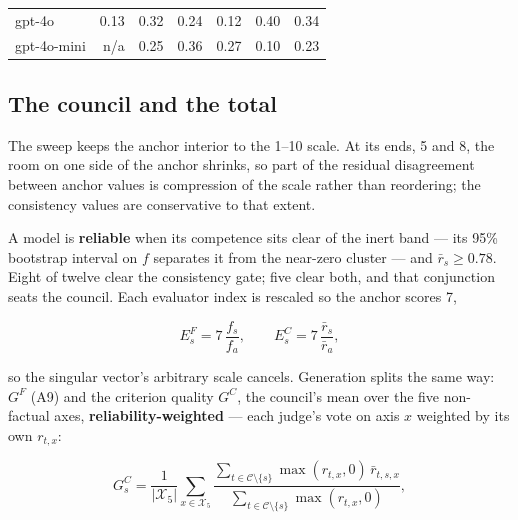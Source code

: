 \documentclass{article}
\begin{document}
\begin{table}[H]
\begin{center}
{\begin{tabular}{@{}lrrrrrr@{}}
gpt-4o &\cellcolor[HTML]{EBF7B1}\textcolor[HTML]{1A1A1A}{0.13}&\cellcolor[HTML]{9FD9B8}\textcolor[HTML]{1A1A1A}{0.32}&\cellcolor[HTML]{CAEAB4}\textcolor[HTML]{1A1A1A}{0.24}&\cellcolor[HTML]{EEF8B3}\textcolor[HTML]{1A1A1A}{0.12}&\cellcolor[HTML]{73C8BD}\textcolor[HTML]{1A1A1A}{0.40}&\cellcolor[HTML]{93D5B9}\textcolor[HTML]{1A1A1A}{0.34} \\
gpt-4o-mini & n/a &\cellcolor[HTML]{C7E9B4}\textcolor[HTML]{1A1A1A}{0.25}&\cellcolor[HTML]{88D0BA}\textcolor[HTML]{1A1A1A}{0.36}&\cellcolor[HTML]{BBE5B5}\textcolor[HTML]{1A1A1A}{0.27}&\cellcolor[HTML]{F1F9B9}\textcolor[HTML]{1A1A1A}{0.10}&\cellcolor[HTML]{CDEBB4}\textcolor[HTML]{1A1A1A}{0.23} \\
\bottomrule
\end{tabular}}
\end{center}
\end{table}

\subsection{The council and the total}\label{the-council-and-the-total}

The sweep keeps the anchor interior to the 1--10 scale. At its ends, 5 and 8, the room on one side of the anchor shrinks, so part of the residual disagreement between anchor values is compression of the scale rather than reordering; the consistency values are conservative to that extent.

A model is \textbf{reliable} when its competence sits clear of the inert band --- its 95\% bootstrap interval on \(f\) separates it from the near-zero cluster --- and \(\bar r_s\ge0.78\). Eight of twelve clear the consistency gate; five clear both, and that conjunction seats the council. Each evaluator index is rescaled so the anchor scores 7,

\[ E^{F}_s=7\,\frac{f_s}{f_a},\qquad E^{C}_s=7\,\frac{\bar r_s}{\bar r_a}, \tag{A12}\]

so the singular vector's arbitrary scale cancels. Generation splits the same way: \(G^{F}\) (A9) and the criterion quality \(G^{C}\), the council's mean over the five non-factual axes, \textbf{reliability-weighted} --- each judge's vote on axis \(x\) weighted by its own \(r_{t,x}\):

\[ G^{C}_s=\frac{1}{|\mathcal{X}_{5}|}\sum_{x\in\mathcal{X}_{5}}\frac{\sum_{t\in\mathcal{C}\setminus\{s\}}\max(r_{t,x},0)\,\bar r_{t,s,x}}{\sum_{t\in\mathcal{C}\setminus\{s\}}\max(r_{t,x},0)}, \tag{A12b}\]
\end{document}
